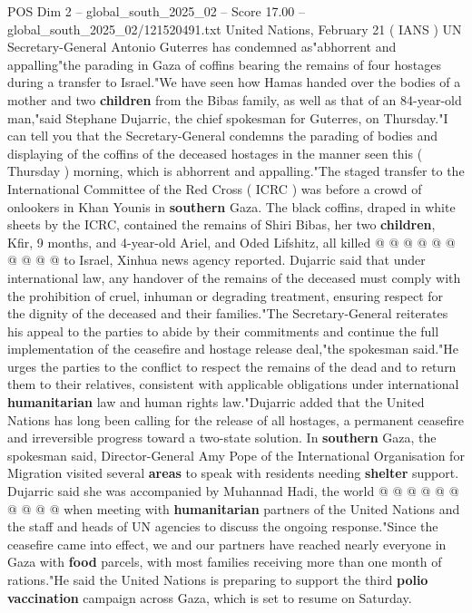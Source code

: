 \begin{textsample}{POS Dim 2 – global\_south\_2025\_02 – Score 17.00 – global\_south\_2025\_02/121520491.txt}  \label{ex:f2_pos_429}
United Nations, February 21 ( IANS ) UN Secretary-General Antonio Guterres has condemned as"abhorrent and appalling"the parading in Gaza of coffins bearing the remains of four hostages during a transfer to Israel."We have seen how Hamas handed over the bodies of a mother and two \textbf{children} from the Bibas family, as well as that of an 84-year-old man,"said Stephane Dujarric, the chief spokesman for Guterres, on Thursday."I can tell you that the Secretary-General condemns the parading of bodies and displaying of the coffins of the deceased hostages in the manner seen this ( Thursday ) morning, which is abhorrent and appalling."The staged transfer to the International Committee of the Red Cross ( ICRC ) was before a crowd of onlookers in Khan Younis in \textbf{southern} Gaza.
The black coffins, draped in white sheets by the ICRC, contained the remains of Shiri Bibas, her two \textbf{children}, Kfir, 9 months, and 4-year-old Ariel, and Oded Lifshitz, all killed @ @ @ @ @ @ @ @ @ @ to Israel, Xinhua news agency reported.
Dujarric said that under international law, any handover of the remains of the deceased must comply with the prohibition of cruel, inhuman or degrading treatment, ensuring respect for the dignity of the deceased and their families."The Secretary-General reiterates his appeal to the parties to abide by their commitments and continue the full implementation of the ceasefire and hostage release deal,"the spokesman said."He urges the parties to the conflict to respect the remains of the dead and to return them to their relatives, consistent with applicable obligations under international \textbf{humanitarian} law and human rights law."Dujarric added that the United Nations has long been calling for the release of all hostages, a permanent ceasefire and irreversible progress toward a two-state solution.
In \textbf{southern} Gaza, the spokesman said, Director-General Amy Pope of the International Organisation for Migration visited several \textbf{areas} to speak with residents needing \textbf{shelter} support.
Dujarric said she was accompanied by Muhannad Hadi, the world @ @ @ @ @ @ @ @ @ @ when meeting with \textbf{humanitarian} partners of the United Nations and the staff and heads of UN agencies to discuss the ongoing response."Since the ceasefire came into effect, we and our partners have reached nearly everyone in Gaza with \textbf{food} parcels, with most families receiving more than one month of rations."He said the United Nations is preparing to support the third \textbf{polio} \textbf{vaccination} campaign across Gaza, which is set to resume on Saturday.

\end{textsample}
